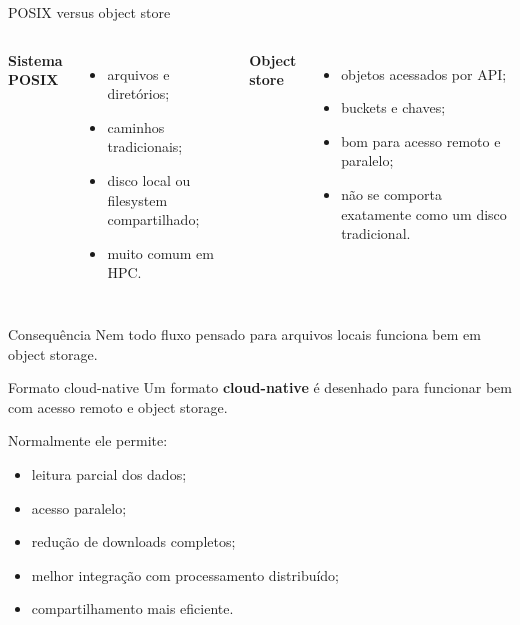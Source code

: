 \documentclass[aspectratio=169]{beamer}
\begin{document}
\begin{frame}{POSIX versus object store}
\begin{columns}
\textbf{Sistema POSIX}
\begin{itemize}
  \item arquivos e diretórios;
  \item caminhos tradicionais;
  \item disco local ou filesystem compartilhado;
  \item muito comum em HPC.
\end{itemize}

\textbf{Object store}
\begin{itemize}
  \item objetos acessados por API;
  \item buckets e chaves;
  \item bom para acesso remoto e paralelo;
  \item não se comporta exatamente como um disco tradicional.
\end{itemize}
\end{columns}

\vspace{0.4cm}

\begin{block}{Consequência}
Nem todo fluxo pensado para arquivos locais funciona bem em object storage.
\end{block}
\end{frame}

\begin{frame}{Formato cloud-native}
\Large
Um formato \textbf{cloud-native} é desenhado para funcionar bem com acesso remoto e object storage.

\vspace{0.4cm}

Normalmente ele permite:

\begin{itemize}
  \item leitura parcial dos dados;
  \item acesso paralelo;
  \item redução de downloads completos;
  \item melhor integração com processamento distribuído;
  \item compartilhamento mais eficiente.
\end{itemize}
\end{frame}
\end{document}
